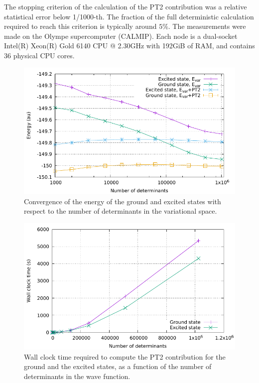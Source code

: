 \documentclass[./thesis.tex]{subfiles}
\begin{document}
The stopping criterion of the calculation of the PT2 contribution was a
relative statistical error below 1/1000-th.
The fraction of the full deterministic calculation required to reach this criterion
is typically around $5\%$.
The measurements were made on the Olympe supercomputer (CALMIP). Each node is 
a dual-socket Intel(R) Xeon(R) Gold 6140 CPU @ 2.30GHz with 192GiB of RAM, and
contains 36 physical CPU cores.

\begin{figure}[h]
	\begin{center}
		\includegraphics[width=0.8\columnwidth]{figures/pt2/cn3_energy}
		\caption{Convergence of the energy of the ground and excited states with respect to the number of determinants in the variational space.}
		\label{fig:energy_pt2}
	\end{center}
\end{figure}
\begin{figure}[h]
	\begin{center}
		\includegraphics[width=0.8\columnwidth]{figures/pt2/scaling_det}
		\caption{Wall clock time required to compute the PT2 contribution for the ground and the excited states, as a function of the number of determinants in the wave function.}
		\label{fig:scaling_det_pt2}
	\end{center}
\end{figure}
\end{document}
